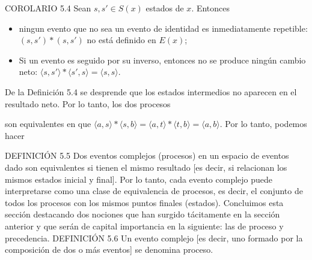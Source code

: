 \begin{justifying}
    \noindent COROLARIO 5.4 Sean $s, s' \in S(x)$ estados de $x$. Entonces
    \begin{itemize}
        \item[(i)] ningun evento que no sea un evento de identidad es inmediatamente repetible: $(s, s') * (s, s')$ no est\'a definido en $E(x)$;
        \item[(ii)] Si un evento es seguido por su inverso, entonces no se produce ningún cambio neto: $ \langle s, s' \rangle * \langle s', s \rangle = \langle s, s \rangle. $
    \end{itemize}

    De la Definición 5.4 se desprende que los estados 
    intermedios no aparecen en el resultado neto. Por lo tanto, los dos procesos
    \bigskip
    \begin{center}
    \end{center}
    \bigskip

    \noindent son equivalentes en que $\langle a, s \rangle * \langle s, b \rangle = \langle a, t \rangle * \langle t, b \rangle = \langle a, b \rangle$. Por lo tanto, podemos hacer

    \bigskip

    \noindent DEFINICIÓN 5.5 Dos eventos complejos (procesos) en un espacio de eventos dado son equivalentes si tienen el mismo resultado [es decir, si relacionan los mismos estados inicial y final].
    Por lo tanto, cada evento complejo puede interpretarse como una clase de equivalencia de procesos, es decir, el conjunto de todos los procesos con los mismos puntos finales (estados).
    Concluimos esta sección destacando dos nociones que han surgido tácitamente en la sección anterior y que serán de capital importancia en la siguiente: las de proceso y precedencia.
    DEFINICIÓN 5.6 Un evento complejo [es decir, uno formado por la composición de dos o más eventos] se denomina proceso.


\end{justifying}
